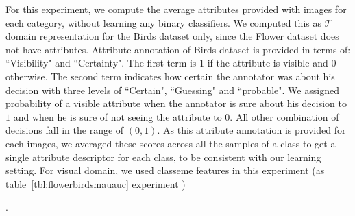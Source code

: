 

For this experiment, we compute the average attributes provided with images for each category, without learning any binary classifiers.  We computed this as  \small$\mathcal{T}\,$\normalsize domain representation for the Birds dataset only, since the Flower dataset does not have attributes. Attribute annotation of Birds dataset is provided in terms of: ``Visibility" and ``Certainty". The first term is $1$ if the attribute is visible and $0$ otherwise. The second term indicates how certain the annotator was about his decision with three levels of ``Certain", ``Guessing" and ``probable". We assigned probability of a visible attribute when the annotator is sure about his decision to $1$ and when he is sure of not seeing the attribute to $0$. All other combination of decisions fall in the range of $(0,1)$. As this attribute annotation is provided for each images, we averaged these scores across all the samples of a class to get a single attribute descriptor for each class, to be consistent with our learning setting. For visual domain, we used classeme features in this experiment (as table~\ref{tbl:flowerbirdsmauauc} experiment ). 





